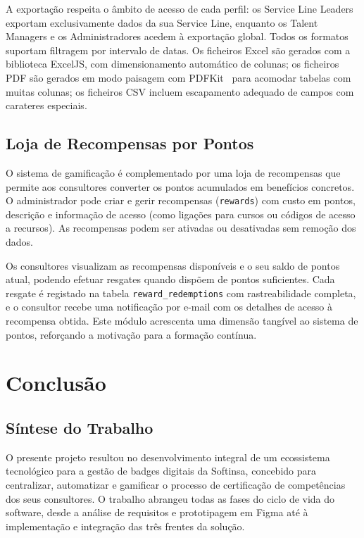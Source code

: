 \documentclass[12pt,a4paper]{report}
\begin{document}
A exportação respeita o âmbito de acesso de cada perfil: os Service Line Leaders exportam exclusivamente dados da sua Service Line, enquanto os Talent Managers e os Administradores acedem à exportação global. Todos os formatos suportam filtragem por intervalo de datas. Os ficheiros Excel são gerados com a biblioteca ExcelJS, com dimensionamento automático de colunas; os ficheiros PDF são gerados em modo paisagem com PDFKit~\cite{pdfkit} para acomodar tabelas com muitas colunas; os ficheiros CSV incluem escapamento adequado de campos com carateres especiais.

\section{Loja de Recompensas por Pontos}

O sistema de gamificação é complementado por uma loja de recompensas que permite aos consultores converter os pontos acumulados em benefícios concretos. O administrador pode criar e gerir recompensas (\texttt{rewards}) com custo em pontos, descrição e informação de acesso (como ligações para cursos ou códigos de acesso a recursos). As recompensas podem ser ativadas ou desativadas sem remoção dos dados.

Os consultores visualizam as recompensas disponíveis e o seu saldo de pontos atual, podendo efetuar resgates quando dispõem de pontos suficientes. Cada resgate é registado na tabela \texttt{reward\_redemptions} com rastreabilidade completa, e o consultor recebe uma notificação por e-mail com os detalhes de acesso à recompensa obtida. Este módulo acrescenta uma dimensão tangível ao sistema de pontos, reforçando a motivação para a formação contínua.

\chapter{Conclusão}
\label{ch:conclusao}

\section{Síntese do Trabalho}

O presente projeto resultou no desenvolvimento integral de um ecossistema tecnológico para a gestão de badges digitais da Softinsa, concebido para centralizar, automatizar e gamificar o processo de certificação de competências dos seus consultores. O trabalho abrangeu todas as fases do ciclo de vida do software, desde a análise de requisitos e prototipagem em Figma até à implementação e integração das três frentes da solução.
\end{document}
